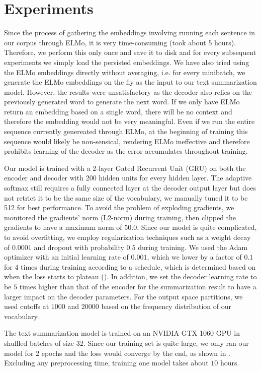 \section{Experiments}
\label{sec: exp}

Since the process of gathering the embeddings involving running each sentence in our corpus through ELMo, it is very time-consuming (took about 5 hours). Therefore, we perform this only once and save it to disk and for every subsequent experiments we simply load the persisted embeddings. We have also tried using the ELMo embeddings directly without averaging, i.e. for every minibatch, we generate the ELMo embeddings on the fly as the input to our text summarization model. However, the results were unsatisfactory as the decoder also relies on the previously generated word to generate the next word. If we only have ELMo return an embedding based on a single word, there will be no context and therefore the embedding would not be very meaningful. Even if we run the entire sequence currently genereated through ELMo, at the beginning of training this sequence would likely be non-sensical, rendering ELMo ineffective and therefore prohibits learning of the decoder as the error accumulates throughout training.

Our model is trained with a 2-layer Gated Recurrent Unit (GRU) on both the encoder and decoder with 200 hidden units for every hidden layer. The adaptive softmax still requires a fully connected layer at the decoder output layer but does not retrict it to be the same size of the vocabulary, we manually tuned it to be 512 for best performance. To avoid the problem of exploding gradients, we monitored the gradients' norm (L2-norm) during training, then clipped the gradients to have a maximum norm of $50.0$. Since our model is quite complicated, to avoid overfitting, we employ regularization techniques such as a weight decay of $0.0001$ and dropout with probability $0.5$ during training. We used the Adam optimizer with an initial learning rate of $0.001$, which we lower by a factor of $0.1$ for $4$ times during training according to a schedule, which is determined based on when the loss starts to plateau (). In addition, we set the decoder learning rate to be $5$ times higher than that of the encoder for the summarization result to have a larger impact on the decoder parameters. For the output space partitions, we used cutoffs at $1000$ and $20000$ based on the frequency distribution of our vocabulary. 

The text summarization model is trained on an NVIDIA GTX 1060 GPU in shuffled batches of size $32$. Since our training set is quite large, we only ran our model for $2$ epochs and the loss would converge by the end, as shown in . Excluding any preprocessing time, training one model takes about $10$ hours.



